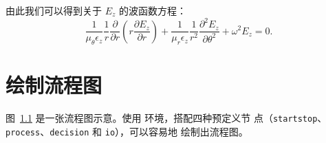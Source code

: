 \documentclass{sjtureport}
\begin{document}
由此我们可以得到关于 $E_z$ 的波函数方程：
\begin{equation}
	\frac{1}{\mu_\theta \epsilon_z} \frac{1}{r} \frac{\partial}{\partial r}
	\left(r \frac{\partial E_z}{\partial r} \right) + \frac{1}{\mu_r \epsilon_z}
	\frac{1}{r^2} \frac{\partial^2E_z}{\partial\theta^2} +\omega^2 E_z = 0.
\end{equation}

\chapter{绘制流程图}

图~\ref{fig:flow_chart} 是一张流程图示意。使用  环境，搭配四种预定义节
点（\verb|startstop|、\verb|process|、\verb|decision| 和 \verb|io|），可以容易地
绘制出流程图。

\begin{figure}[!htp]
	\centering
	
	\label{fig:flow_chart}
\end{figure}

\end{document}
